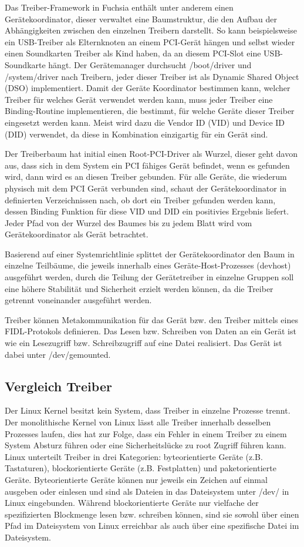 \documentclass[a4paper]{scrartcl}
\begin{document}
Das Treiber-Framework in Fuchsia enthält unter anderem einen Gerätekoordinator, dieser verwaltet eine Baumstruktur, die den Aufbau der Abhängigkeiten zwischen den einzelnen Treibern darstellt. So kann beispielsweise ein USB-Treiber als Elternknoten an einem PCI-Gerät hängen und selbst wieder einen Soundkarten Treiber als Kind haben, da an diesem PCI-Slot eine USB-Soundkarte hängt. Der Gerätemanager durchsucht /boot/driver und /system/driver nach Treibern, jeder dieser Treiber ist als Dynamic Shared Object (DSO) implementiert. Damit der Geräte Koordinator bestimmen kann, welcher Treiber für welches Gerät verwendet werden kann, muss jeder Treiber eine Binding-Routine implementieren, die bestimmt, für welche Geräte dieser Treiber eingesetzt werden kann. Meist wird dazu die Vendor ID (VID) und Device ID (DID) verwendet, da diese in Kombination einzigartig für ein Gerät sind. 

Der Treiberbaum hat initial einen Root-PCI-Driver als Wurzel, dieser geht davon aus, dass sich in dem System ein PCI fähiges Gerät befindet, wenn es gefunden wird, dann wird es an diesen Treiber gebunden. Für alle Geräte, die wiederum physisch mit dem PCI Gerät verbunden sind, schaut der Gerätekoordinator in definierten Verzeichnissen nach, ob dort ein Treiber gefunden werden kann, dessen Binding Funktion für diese VID und DID ein positivies Ergebnis liefert. Jeder Pfad von der Wurzel des Baumes bis zu jedem Blatt wird vom Gerätekoordinator als Gerät betrachtet.

Basierend auf einer Systemrichtlinie splittet der Gerätekoordinator den Baum in einzelne Teilbäume, die jeweils innerhalb eines Geräte-Host-Prozesses (devhost) ausgeführt werden, durch die Teilung der Gerätetreiber in einzelne Gruppen soll eine höhere Stabilität und Sicherheit erzielt werden können, da die Treiber getrennt voneinander ausgeführt werden.

Treiber können Metakommunikation für das Gerät bzw. den Treiber mittels eines FIDL-Protokols definieren. Das Lesen bzw. Schreiben von Daten an ein Gerät ist wie ein Lesezugriff bzw. Schreibzugriff auf eine Datei realisiert. Das Gerät ist dabei unter /dev/gemounted.
\subsection{Vergleich Treiber}
Der Linux Kernel besitzt kein System, dass Treiber in einzelne Prozesse trennt. Der monolithische Kernel von Linux lässt alle Treiber innerhalb desselben Prozesses laufen, dies hat zur Folge, dass ein Fehler in einem Treiber zu einem System Absturz führen oder eine Sicherheitslücke zu root Zugriff führen kann. Linux unterteilt Treiber in drei Kategorien: byteorientierte Geräte (z.B. Tastaturen), blockorientierte Geräte (z.B. Festplatten) und paketorientierte Geräte. Byteorientierte Geräte können nur jeweils ein Zeichen auf einmal ausgeben oder einlesen und sind als Dateien in das Dateisystem unter /dev/ in Linux eingebunden. Während blockorientierte Geräte nur vielfache der spezifizierten Blockmenge lesen bzw. schreiben können, sind sie sowohl über einen Pfad im Dateisystem von Linux erreichbar als auch über eine spezifische Datei im Dateisystem. 
\end{document}
